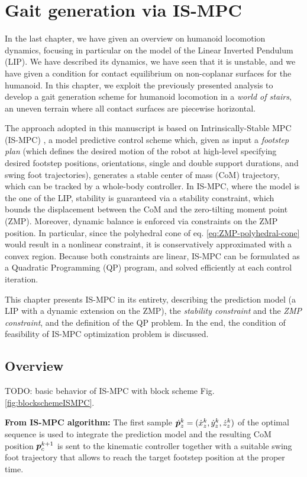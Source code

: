\chapter{Gait generation via IS-MPC}
\label{ch:ISMPC}
In the last chapter, we have given an overview on humanoid locomotion dynamics,
focusing in particular on the model of the Linear Inverted Pendulum (LIP). We have
described its dynamics, we have seen that it is unstable, and we have given a
condition for contact equilibrium on non-coplanar surfaces for the humanoid.
In this chapter, we exploit the previously
presented analysis to develop a gait generation scheme for humanoid locomotion
in a \textit{world of stairs}, an uneven terrain where all contact surfaces 
are piecewise horizontal.

The approach adopted in this manuscript is based on
Intrinsically-Stable MPC (IS-MPC) \cite{Scianca2020TRO},
a model predictive control scheme which, given as input a \textit{footstep plan}
(which defines the desired motion of the robot at high-level specifying desired
footstep positions, orientations, single and double support durations, and swing
foot trajectories), generates
a stable center of mass (CoM) trajectory, which can be tracked by a whole-body
controller. In IS-MPC, where the model is the one of the LIP, stability is
guaranteed via a stability constraint, which
bounds the displacement between the CoM and the zero-tilting moment point (ZMP).
Moreover, dynamic balance is enforced via constraints on the ZMP
position. In particular, since the polyhedral cone of eq.
\eqref{eq:ZMP-polyhedral-cone} would result in a nonlinear constraint, it is
conservatively approximated with a convex region. Because both constraints are 
linear, IS-MPC can be formulated as a Quadratic Programming (QP) program, and 
solved efficiently at each control iteration.

This chapter presents IS-MPC in its entirety, describing the prediction model (a LIP with a 
dynamic extension on the ZMP), the \textit{stability constraint} and the \textit{ZMP constraint}, and the
definition of the QP problem. In the end, the condition of feasibility of IS-MPC
optimization problem is discussed.

\section{Overview}
TODO: basic behavior of IS-MPC with block scheme Fig. \ref{fig:blockschemeISMPC}.

\textbf{From IS-MPC algorithm:} The first sample $\dot {{\bm{p}}}_z^k = (\dot x_z^k, \dot y_z^k, \dot z_z^k)$ of the
optimal sequence is used to integrate the prediction model and the resulting
CoM position ${\bm{p}}_c^{k+1}$ is sent to the kinematic controller together with
a suitable swing foot trajectory that allows to reach the target footstep
position at the proper time.


